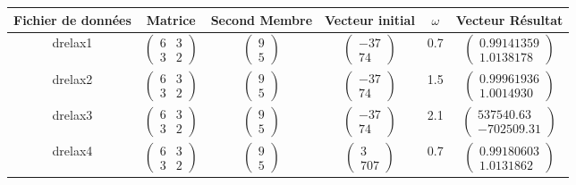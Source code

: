 \documentclass{article}
\theoremstyle{mes_theoremes}
\begin{document}
\bigskip
\begin{tabular}{|c|c|c|c|c|c|}
\hline
Fichier de données & Matrice & Second Membre & Vecteur initial & $\omega$  & Vecteur Résultat\\
\hline
 drelax1 & $\left(\begin{matrix} 6 & 3 \\ 3 & 2 \end{matrix}\right)$ & $\left(\begin{matrix} 9\\ 5\end{matrix}\right)$ &   $\left(\begin{matrix} -37\\ 74\end{matrix}\right)$ & 0.7 &  $\left(\begin{matrix} 0.99141359 \\  1.0138178   \end{matrix}\right)$  \\
\hline
 drelax2 & $\left(\begin{matrix} 6 & 3 \\ 3 & 2 \end{matrix}\right)$ & $\left(\begin{matrix} 9\\ 5\end{matrix}\right)$ &   $\left(\begin{matrix} -37\\ 74\end{matrix}\right)$ & 1.5 &  $\left(\begin{matrix} 0.99961936 \\ 1.0014930    \end{matrix}\right)$  \\
\hline
drelax3 & $\left(\begin{matrix} 6 & 3 \\ 3 & 2 \end{matrix}\right)$ & $\left(\begin{matrix} 9\\ 5\end{matrix}\right)$ &   $\left(\begin{matrix} -37\\ 74\end{matrix}\right)$ & 2.1 &  $\left(\begin{matrix}  537540.63  \\  -702509.31     \end{matrix}\right)$  \\
\hline
drelax4 & $\left(\begin{matrix} 6 & 3 \\ 3 & 2 \end{matrix}\right)$ & $\left(\begin{matrix} 9\\ 5\end{matrix}\right)$ &   $\left(\begin{matrix} 3\\ 707\end{matrix}\right)$ & 0.7 &  $\left(\begin{matrix}  0.99180603   \\  1.0131862     \end{matrix}\right)$  \\

\end{tabular}
\end{document}
